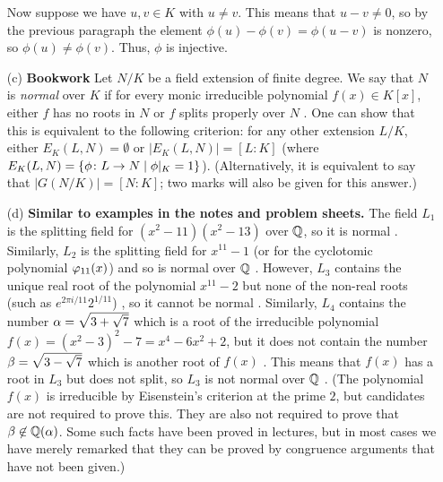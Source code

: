 \documentclass[a4paper]{article}
\begin{document}
\begin{solution}
\begin{itemize}
   Now suppose we have $u,v\in K$ with $u\neq v$.  This means that
   $u-v\neq 0$, so by the previous paragraph the element
   $\phi(u)-\phi(v)=\phi(u-v)$ is nonzero, so $\phi(u)\neq\phi(v)$.
   Thus, $\phi$ is injective. 
  \item[(c)] \textbf{Bookwork}
   Let $N/K$ be a field extension of finite degree.  We say
   that $N$ is \emph{normal} over $K$ if for every monic irreducible
   polynomial $f(x)\in K[x]$, either $f$ has no roots in $N$ or $f$
   splits properly over $N$ .  One can show that this is equivalent to
   the following criterion: for any other extension $L/K$, either
   $E_K(L,N)=\emptyset$ or $|E_K(L,N)|=[L:K]$ (where
   $E_K(L,N)=\{\phi\colon L\to N\;|\; \phi|_K=1\}$).   (Alternatively,
   it is equivalent to say that $|G(N/K)|=[N:K]$; two marks will also
   be given for this answer.)
  \item[(d)] \textbf{Similar to examples in the notes and problem sheets.}
   The field $L_1$ is the splitting field for
   $(x^2-11)(x^2-13)$ over ${\mathbb{Q}}$, \mk so it is normal \mk.  Similarly, $L_2$ is
   the splitting field for $x^{11}-1$ (or for the cyclotomic
   polynomial $\varphi_{11}(x)$) \mk and so is normal over ${\mathbb{Q}}$ \mk.  However,
   $L_3$ contains the unique real root of the polynomial $x^{11}-2$
   but none of the non-real roots (such as $e^{2\pi i/11}2^{1/11}$) \mk,
   so it cannot be normal \mk.  Similarly, $L_4$ contains the number
   $\alpha=\sqrt{3+\sqrt{7}}$ which is a root of the irreducible
   polynomial $f(x)=(x^2-3)^2-7=x^4-6x^2+2$, but it does not contain the
   number $\beta=\sqrt{3-\sqrt{7}}$ which is another root of $f(x)$ \mk.
   This means that $f(x)$ has a root in $L_3$ but does not split, so
   $L_3$ is not normal over ${\mathbb{Q}}$ \mk.  (The polynomial $f(x)$ is
   irreducible by Eisenstein's criterion at the prime $2$, but
   candidates are not required to prove this.  They are also not
   required to prove that $\beta\not\in{\mathbb{Q}}(\alpha)$.  Some such facts have
   been proved in lectures, but in most cases we have merely remarked
   that they can be proved by congruence arguments that have not been
   given.)
 \end{itemize}
\end{solution}
\end{document}
